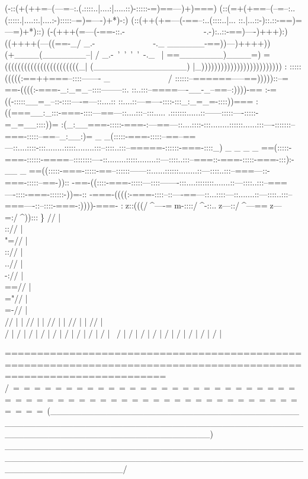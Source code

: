                               (-::(+(++=--(---=--:.(.::::..|....:|.....::)-:::::-=)==---)+)===)
                              (::(=+(+==--(--=--:..(:::::.|....::.|....:-):::::--=)=----)+*)-:)
                              (::(++(+=---(-==--:..(::::..|... ::.|...::-)::.::-==)=---=)+*)::)
                               (-(+++(=---(-==-::.-~~~~~~~~~~~~~~~~~~~-.-):..::-==)----)+++):)
                               ((++++(---((==-_/  _.-~~~~~~~~~~~~~~-._  \______-==))---)++++))
                                (+____(_______--| /  _.-~'~'~'~'~-._  \ |    ==_______)____=)
                      =    (((((((((((((((((((((((_| (_______________) |_)))))))))))))))))))))))))    :
                 :::::(((((:==++===--::::-------      \_~~~~~~~~~~~~~~/      ::::::--======-----==)))))::--=
               ==-((((:-===-_:_=_--::::--------::.                         ::..:::--====----__-_--==--:))))-==
             :-=((-:::::__=_--::-::::----=---::....::                   ::....::---=----::::-:::_:_=_=-::::))===
             :((===__:_:::-===-::::---==---::....:::--:::..... .:::::::......::------:::::----:::::-=_=__::::))=
            :(_:__===-:::::-===-:---==---::....::::-:::........::::::......:::----:::::::--===-:::::--==--_:__:)=
         _ _(:::::-===-:::::--==--==---::....::::-:::........:::::........:::--::::..:::--=====-::::::-===-::::_) _
    _ _ _  ==(:::::-===-::::::-====--::::::::----::........:::::........::---::::..:::--===::-===-:::::-===-:::):-  __ _
            ==((:::::-===-:::::-==--::::::------::......::::::........::---::::..:::--===---::-===-:::::--==-))::
            -==-((::::-===-:::::---::::-------:::....::::::::.......::---::::..:::--===----::::-===-::::::-))=-::
             -===-((((:-===-::::--::----==---::...::::---::.......::---::::..:::--===----::--::::-===-:))))-===-
             :^^^^^:::(((/^^^^\:----=^^^^^--::::/^^^^\--::..^^^^^:---::/^^^^\:---==^^^^^:---=:/^^^^\))):::^^^^^=
            //  |  \\:://   |  \\"=//  |  \\:://  |   \\..//  |  \\-://   |  \\==//  |  \\="//  |   \\=-//  |  \\
          //    |    \/     |    //    |    \/    |     //    |    \/     |    //    |    \/    |     //    |    \\
          /     |    /      |    /     |    /     |     /     |    /      |    /     |    /     |     /     |     \
         /      |    /      |   /      |    /     |    /      |    /      |   /      |    /     |    /      |      \

    =====================================================================================================================
  /~=~=~=~=~=~=~=~=~=~=~=~=~=~=~=~=~=~=~=~=~=~=~=~=~=~=~=~=~=~=~=~=~=~=~=~=~=~=~=~=~=~=~=~=~=~=~=~=~=~=~=~=~=~=~=~=~=~=~=\
 (_________________________________________________________________________________________________________________________)
    \___________________________________________________________________________________________________________________/